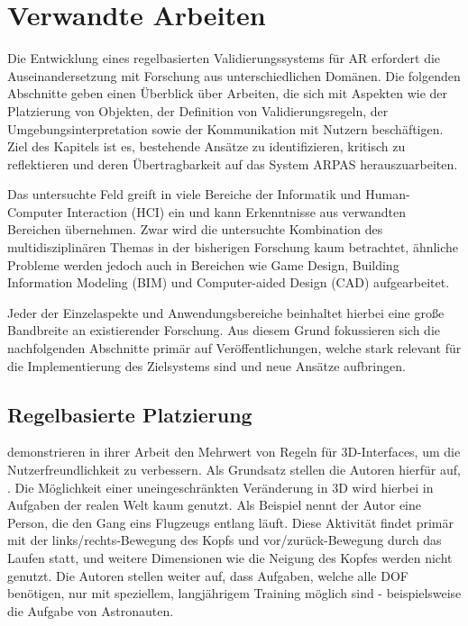 \section{Verwandte Arbeiten}\label{section:Verwandte Arbeiten}

Die Entwicklung eines regelbasierten Validierungssystems für AR erfordert die Auseinandersetzung mit Forschung aus unterschiedlichen Domänen. Die folgenden Abschnitte geben einen Überblick über Arbeiten, die sich mit Aspekten wie der Platzierung von Objekten, der Definition von Validierungsregeln, der Umgebungsinterpretation sowie der Kommunikation mit Nutzern beschäftigen. Ziel des Kapitels ist es, bestehende Ansätze zu identifizieren, kritisch zu reflektieren und deren Übertragbarkeit auf das System ARPAS herauszuarbeiten.

Das untersuchte Feld greift in viele Bereiche der Informatik und Human-Computer Interaction (HCI) ein und kann Erkenntnisse aus verwandten Bereichen übernehmen. Zwar wird die untersuchte Kombination des multidisziplinären Themas in der bisherigen Forschung kaum betrachtet, ähnliche Probleme werden jedoch auch in Bereichen wie Game Design, Building Information Modeling (BIM) und Computer-aided Design (CAD) aufgearbeitet.

Jeder der Einzelaspekte und Anwendungsbereiche beinhaltet hierbei eine große Bandbreite an existierender Forschung. Aus diesem Grund fokussieren sich die nachfolgenden Abschnitte primär auf Veröffentlichungen, welche stark relevant für die Implementierung des Zielsystems sind und neue Ansätze aufbringen.

\subsection{Regelbasierte Platzierung}

\textcite{stuerzlingerValueConstraints3D2011a} demonstrieren in ihrer Arbeit den Mehrwert von Regeln für 3D-Interfaces, um die Nutzerfreundlichkeit zu verbessern. Als Grundsatz stellen die Autoren hierfür auf,  \parencite[S. 9]{stuerzlingerValueConstraints3D2011a}. Die Möglichkeit einer uneingeschränkten Veränderung in 3D wird hierbei in Aufgaben der realen Welt kaum genutzt. Als Beispiel nennt der Autor eine Person, die den Gang eins Flugzeugs entlang läuft. Diese Aktivität findet primär mit der links/rechts-Bewegung des Kopfs und vor/zurück-Bewegung durch das Laufen statt, und weitere Dimensionen wie die Neigung des Kopfes werden nicht genutzt. Die Autoren stellen weiter auf, dass Aufgaben, welche alle DOF benötigen, nur mit speziellem, langjährigem Training möglich sind - beispielsweise die Aufgabe von Astronauten.

